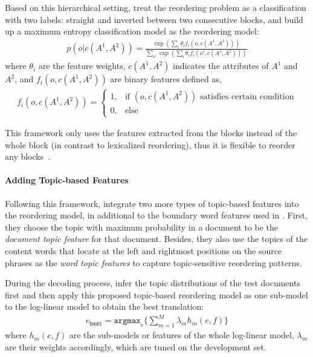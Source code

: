 Based on this hierarchical setting, \citet{Xiong-2006} treat the
reordering problem as a classification with two labels: straight and
inverted between two consecutive blocks, and build up a maximum
entropy classification model as the reordering model:
\begin{align}
p(o|c(A^1, A^2)) = \frac{\exp(\sum_i \theta_i f_i(o, c(A^1, A^2)))}{\sum_{o'} \exp(\sum_i \theta_i f_i(o', c(A^1, A^2)))}
\end{align}
where $\theta_i$ are the feature weights, $c(A^1, A^2)$ indicates the attributes of $A^1$ and $A^2$, and $f_i(o, c(A^1, A^2))$ are binary features defined as,
\begin{align}
f_i(o, c(A^1,A^2)) = \begin{cases}
1, &\text{if $(o,c(A^1, A^2))$ satisfies certain condition} \\
0, &\text{else}
\end{cases}
\end{align}

This framework only uses the features extracted from the blocks
instead of the whole block (in contrast to lexicalized reordering),
thus it is flexible to reorder any blocks~\citep{Xiong-2006}.

\paragraph{Adding Topic-based Features}

Following this framework, \citet{wang-14} integrate two more types of
topic-based features into the reordering model, in additional to the
boundary word features used in \citet{Xiong-2006}. First, they choose
the topic with maximum probability in a document to be the
\textit{document topic feature} for that document. Besides, they also
use the topics of the content words that locate at the left and
rightmost positions on the source phrases as the \textit{word topic
  features} to capture topic-sensitive reordering patterns.

During the decoding process, \citet{Xiong-2006} infer the topic
distributions of the test documents first and then apply this proposed
topic-based reordering model as one sub-model to the log-linear model
to obtain the best translation:
\begin{align}
e_\texttt{best} = \texttt{argmax}_e \Big \{ \sum_{m=1}^M \lambda_m h_m(e,f) \Big \}
\end{align}
where $h_m(e,f)$ are the sub-models or features of the whole
log-linear model, $\lambda_m$ are their weights accordingly, which are
tuned on the development set.

